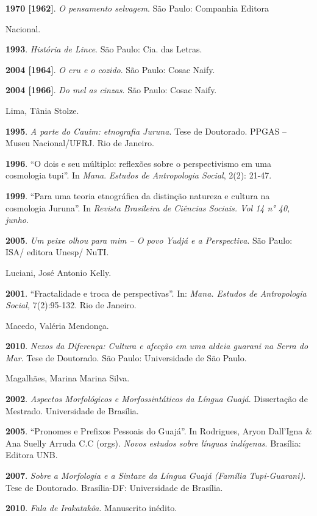 \textbf{1970 {[}1962{]}}. \emph{O pensamento selvagem}. São Paulo:
Companhia Editora

Nacional.

\textbf{1993}. \emph{História de Lince}. São Paulo: Cia. das Letras.

\textbf{2004 {[}1964{]}}. \emph{O cru e o cozido}. São Paulo: Cosac
Naify.

\textbf{2004 {[}1966{]}}. \emph{Do mel as cinzas}. São Paulo: Cosac
Naify.

Lima, Tânia Stolze.

\textbf{1995}. \emph{A parte do Cauim: etnografia Juruna}. Tese de
Doutorado. PPGAS -- Museu Nacional/UFRJ. Rio de Janeiro.

\textbf{1996}. ``O dois e seu múltiplo: reflexões sobre o perspectivismo
em uma cosmologia tupi''. In \emph{Mana}. \emph{Estudos de Antropologia
Social}, 2(2): 21-47.

\textbf{1999}. ``Para uma teoria etnográfica da distinção natureza e
cultura na cosmologia Juruna''. In \emph{Revista Brasileira de Ciências
Sociais. Vol 14 n° 40, junho}.

\textbf{2005}. \emph{Um peixe olhou para mim -- O povo Yudjá e a
Perspectiva}. São Paulo: ISA/ editora Unesp/ NuTI.

Luciani, José Antonio Kelly.

\textbf{2001}. ``Fractalidade e troca de perspectivas''. In: \emph{Mana.
Estudos de Antropologia Social,} 7(2):95-132. Rio de Janeiro.

Macedo, Valéria Mendonça.

\textbf{2010}. \emph{Nexos da Diferença: Cultura e afecção em uma aldeia
guarani na Serra do Mar}. Tese de Doutorado. São Paulo: Universidade de
São Paulo.

Magalhães, Marina Marina Silva.

\textbf{2002}. \emph{Aspectos Morfológicos e Morfossintáticos da Língua
Guajá}. Dissertação de Mestrado. Universidade de Brasília.

\textbf{2005}. ``Pronomes e Prefixos Pessoais do Guajá''. In Rodrigues,
Aryon Dall'Igna \& Ana Suelly Arruda C.C (orgs). \emph{Novos estudos
sobre línguas indígenas}. Brasília: Editora UNB.

\textbf{2007}. \emph{Sobre a Morfologia e a Sintaxe da Língua Guajá
(Família Tupi-Guarani)}. Tese de Doutorado. Brasília-DF: Universidade de
Brasília.

\textbf{2010}. \emph{Fala de Irakatakôa}. Manuscrito inédito.

